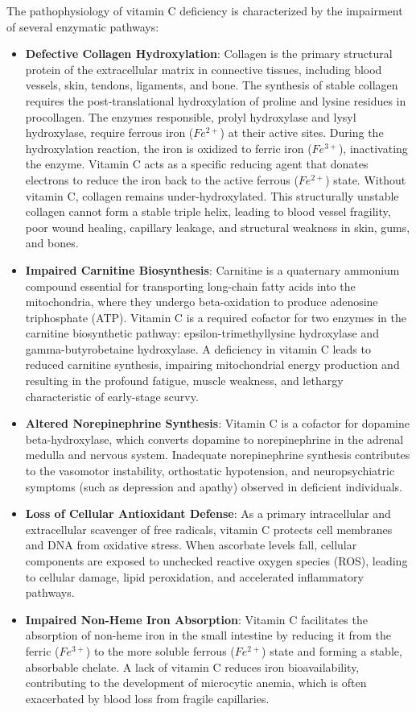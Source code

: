 The pathophysiology of vitamin C deficiency is characterized by the impairment of several enzymatic pathways:
\begin{itemize}
    \item \textbf{Defective Collagen Hydroxylation}: Collagen is the primary structural protein of the extracellular matrix in connective tissues, including blood vessels, skin, tendons, ligaments, and bone. The synthesis of stable collagen requires the post-translational hydroxylation of proline and lysine residues in procollagen. The enzymes responsible, prolyl hydroxylase and lysyl hydroxylase, require ferrous iron ($Fe^{2+}$) at their active sites. During the hydroxylation reaction, the iron is oxidized to ferric iron ($Fe^{3+}$), inactivating the enzyme. Vitamin C acts as a specific reducing agent that donates electrons to reduce the iron back to the active ferrous ($Fe^{2+}$) state. Without vitamin C, collagen remains under-hydroxylated. This structurally unstable collagen cannot form a stable triple helix, leading to blood vessel fragility, poor wound healing, capillary leakage, and structural weakness in skin, gums, and bones.
    \item \textbf{Impaired Carnitine Biosynthesis}: Carnitine is a quaternary ammonium compound essential for transporting long-chain fatty acids into the mitochondria, where they undergo beta-oxidation to produce adenosine triphosphate (ATP). Vitamin C is a required cofactor for two enzymes in the carnitine biosynthetic pathway: epsilon-trimethyllysine hydroxylase and gamma-butyrobetaine hydroxylase. A deficiency in vitamin C leads to reduced carnitine synthesis, impairing mitochondrial energy production and resulting in the profound fatigue, muscle weakness, and lethargy characteristic of early-stage scurvy.
    \item \textbf{Altered Norepinephrine Synthesis}: Vitamin C is a cofactor for dopamine beta-hydroxylase, which converts dopamine to norepinephrine in the adrenal medulla and nervous system. Inadequate norepinephrine synthesis contributes to the vasomotor instability, orthostatic hypotension, and neuropsychiatric symptoms (such as depression and apathy) observed in deficient individuals.
    \item \textbf{Loss of Cellular Antioxidant Defense}: As a primary intracellular and extracellular scavenger of free radicals, vitamin C protects cell membranes and DNA from oxidative stress. When ascorbate levels fall, cellular components are exposed to unchecked reactive oxygen species (ROS), leading to cellular damage, lipid peroxidation, and accelerated inflammatory pathways.
    \item \textbf{Impaired Non-Heme Iron Absorption}: Vitamin C facilitates the absorption of non-heme iron in the small intestine by reducing it from the ferric ($Fe^{3+}$) to the more soluble ferrous ($Fe^{2+}$) state and forming a stable, absorbable chelate. A lack of vitamin C reduces iron bioavailability, contributing to the development of microcytic anemia, which is often exacerbated by blood loss from fragile capillaries.
\end{itemize}

